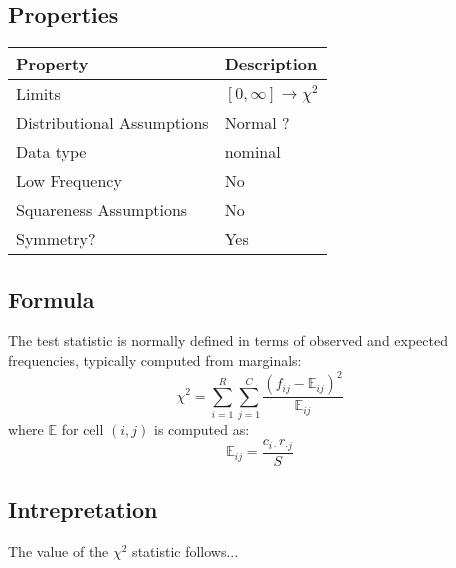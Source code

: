 \documentclass[11pt]{article}
\begin{document}
\subsection{Properties}
\begin{tabular}{| l || l |}
    \hline
    {\bf Property} & {\bf Description} \\
    \hline
    Limits & $[0, \infty] \to \chi^2$  \\ \hline

    Distributional Assumptions & Normal {\color{red} ?} \\ \hline

    Data type & nominal \\ \hline

    Low Frequency & No \\ \hline

    Squareness Assumptions & No \\ \hline
    
    Symmetry? & Yes \\ \hline

\end{tabular}


\subsection{Formula}
The test statistic is normally defined in terms of observed and expected frequencies, typically computed from marginals:
$$
\chi^2 = \sum_{i=1}^R{  \sum_{j=1}^C{ \frac{ (f_{ij} - \mathbb{E}_{ij} )^2 }{ \mathbb{E}_{ij} } } }
$$
where $\mathbb{E}$ for cell $(i,j)$ is computed as:
$$
\mathbb{E}_{ij} = \frac{ c_{i \cdot} r_{\cdot j} }{ S }
$$


\subsection{Intrepretation}
The value of the $\chi^2$ statistic follows...
\end{document}
